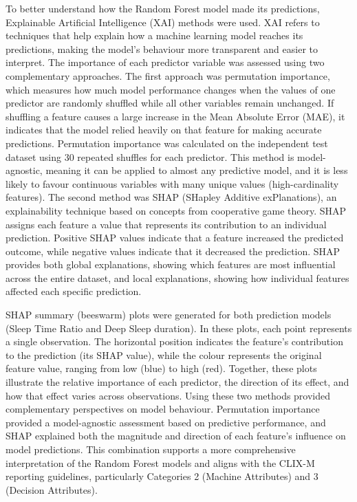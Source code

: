 \documentclass[fleqn,10pt]{wlscirep}
\begin{document}
To better understand how the Random Forest model made its predictions, Explainable Artificial Intelligence (XAI) methods were used. XAI refers to techniques that help explain how a machine learning model reaches its predictions, making the model's behaviour more transparent and easier to interpret. The importance of each predictor variable was assessed using two complementary approaches. The first approach was permutation importance, which measures how much model performance changes when the values of one predictor are randomly shuffled while all other variables remain unchanged. If shuffling a feature causes a large increase in the Mean Absolute Error (MAE), it indicates that the model relied heavily on that feature for making accurate predictions. Permutation importance was calculated on the independent test dataset using 30 repeated shuffles for each predictor. This method is model-agnostic, meaning it can be applied to almost any predictive model, and it is less likely to favour continuous variables with many unique values (high-cardinality features). The second method was SHAP (SHapley Additive exPlanations), an explainability technique based on concepts from cooperative game theory. SHAP assigns each feature a value that represents its contribution to an individual prediction. Positive SHAP values indicate that a feature increased the predicted outcome, while negative values indicate that it decreased the prediction. SHAP provides both global explanations, showing which features are most influential across the entire dataset, and local explanations, showing how individual features affected each specific prediction.

SHAP summary (beeswarm) plots were generated for both prediction models (Sleep Time Ratio and Deep Sleep duration). In these plots, each point represents a single observation. The horizontal position indicates the feature's contribution to the prediction (its SHAP value), while the colour represents the original feature value, ranging from low (blue) to high (red). Together, these plots illustrate the relative importance of each predictor, the direction of its effect, and how that effect varies across observations. Using these two methods provided complementary perspectives on model behaviour. Permutation importance provided a model-agnostic assessment based on predictive performance, and SHAP explained both the magnitude and direction of each feature's influence on model predictions. This combination supports a more comprehensive interpretation of the Random Forest models and aligns with the CLIX-M reporting guidelines, particularly Categories 2 (Machine Attributes) and 3 (Decision Attributes).
\end{document}
